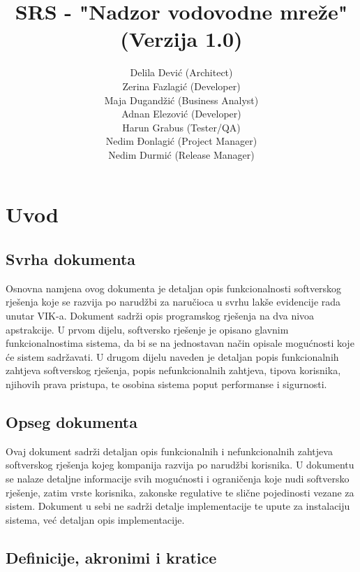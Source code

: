 \documentclass[]{report}
\title{\textbf{SRS} - "Nadzor vodovodne mreže" (Verzija 1.0)}
\author{
Delila Dević (Architect)\\
Zerina Fazlagić (Developer)\\
Maja Dugandžić (Business Analyst)\\
Adnan Elezović (Developer)\\
Harun Grabus (Tester/QA)\\
Nedim Đonlagić (Project Manager)\\
Nedim Durmić (Release Manager)\\
}
\begin{document}
	\maketitle
	
	\renewcommand{\contentsname}{Sadržaj}
	

\tableofcontents

\chapter{Uvod}
\section{Svrha dokumenta}

Osnovna namjena ovog dokumenta je detaljan opis funkcionalnosti softverskog rješenja koje se razvija po narudžbi za naručioca u svrhu lakše evidencije rada unutar VIK-a. Dokument sadrži opis programskog rješenja na dva nivoa apstrakcije.  U prvom dijelu, softversko rješenje je opisano glavnim funkcionalnostima sistema, da bi se na jednostavan način opisale mogućnosti koje će sistem sadržavati.  U drugom dijelu naveden je detaljan popis funkcionalnih zahtjeva softverskog rješenja, popis nefunkcionalnih zahtjeva, tipova korisnika, njihovih prava pristupa, te osobina sistema poput performanse i sigurnosti.

\section{Opseg dokumenta}

Ovaj dokument sadrži detaljan opis funkcionalnih i nefunkcionalnih zahtjeva softverskog  rješenja kojeg kompanija razvija po narudžbi  korisnika. U dokumentu se nalaze detaljne informacije svih mogućnosti i ograničenja koje nudi softversko rješenje, zatim vrste korisnika, zakonske regulative te slične pojedinosti vezane za sistem. Dokument u sebi ne sadrži detalje implementacije te upute za instalaciju sistema, već detaljan opis implementacije.

\section{Definicije, akronimi i kratice}
\end{document}
